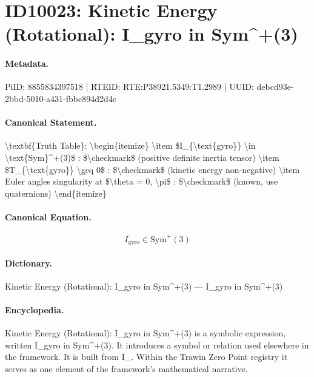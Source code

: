 \section*{ID10023: Kinetic Energy (Rotational): I\_gyro in Sym\textasciicircum{}+(3)}
\paragraph{Metadata.}
PiID: 8855834397518 | RTEID: RTE:P38921.5349:T1.2989 | UUID: debcd93e-2bbd-5010-a431-fbbc894d2d4c

\paragraph{Canonical Statement.}
\textbackslash{}textbf\{Truth Table\}: \textbackslash{}begin\{itemize\} \textbackslash{}item \$I\_\{\textbackslash{}text\{gyro\}\} \textbackslash{}in \textbackslash{}text\{Sym\}\textasciicircum{}+(3)\$ : \$\textbackslash{}checkmark\$ (positive definite inertia tensor) \textbackslash{}item \$T\_\{\textbackslash{}text\{gyro\}\} \textbackslash{}geq 0\$ : \$\textbackslash{}checkmark\$ (kinetic energy non-negative) \textbackslash{}item Euler angles singularity at \$\textbackslash{}theta = 0, \textbackslash{}pi\$ : \$\textbackslash{}checkmark\$ (known, use quaternions) \textbackslash{}end\{itemize\}

\paragraph{Canonical Equation.}
\[
I_{\text{gyro}} \in \text{Sym}^+(3)
\]

\paragraph{Dictionary.}
Kinetic Energy (Rotational): I\_gyro in Sym\textasciicircum{}+(3) — I\_gyro in Sym\textasciicircum{}+(3)

\paragraph{Encyclopedia.}
Kinetic Energy (Rotational): I\_gyro in Sym\textasciicircum{}+(3) is a symbolic expression, written I\_gyro in Sym\textasciicircum{}+(3). It introduces a symbol or relation used elsewhere in the framework. It is built from I\_. Within the Trawin Zero Point registry it serves as one element of the framework's mathematical narrative.
